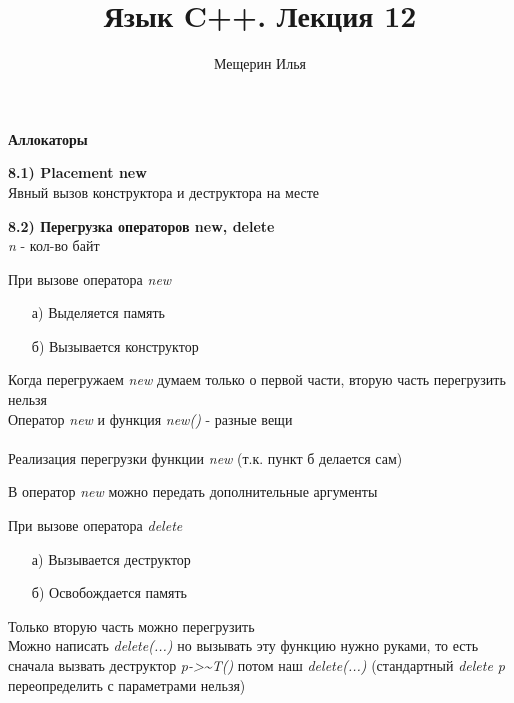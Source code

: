 \documentclass{article}
\title{Язык C++. Лекция 12}
\author{Мещерин Илья}
\date{\DTMdate{2018-11-30}}
\begin{document}
\maketitle

\begin{center}
	\begin{large}
		\textbf{Аллокаторы}
	\end{large}
\end{center}

\noindent \textbf{8.1) Placement new} \\
Явный вызов конструктора и деструктора на месте

\noindent \textbf{8.2) Перегрузка операторов new, delete}\\
\textit{n} - кол-во байт

При вызове оператора \textit{new}
\begin{itemize}
	\item[а)]Выделяется память
	\item[б)]Вызывается конструктор
\end{itemize}
Когда перегружаем \textit{new} думаем только о первой части, вторую часть перегрузить нельзя\\
Оператор \textit{new} и функция \textit{new()} - разные вещи\\\\
Реализация перегрузки функции \textit{new} (т.к. пункт б делается сам)

В оператор \textit{new} можно передать дополнительные аргументы
 
При вызове оператора \textit{delete}
\begin{itemize}
	\item[а)]Вызывается деструктор
	\item[б)]Освобождается память
\end{itemize}
Только вторую часть можно перегрузить\\
Можно написать \textit{delete(...)} но вызывать эту функцию нужно руками, то есть сначала вызвать деструктор \textit{p->\textasciitilde T()} потом наш \textit{delete(...)}
(стандартный \textit{delete p} переопределить с параметрами нельзя)\\\\\\\\\\\\
\end{document}
